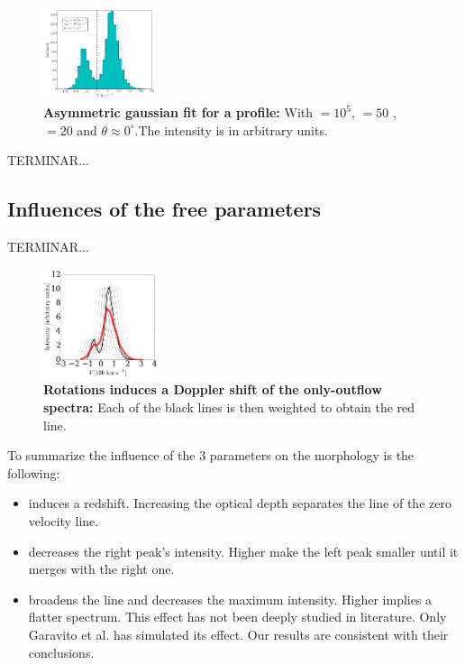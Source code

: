 \documentclass[twocolappendix]{latex/emulateapj}
\begin{document}
\begin{figure}[h!]
	\begin{center}
		\includegraphics[width=0.3\textwidth]{./figures/asymmetric_gaussian_fit}
	\end{center}
	\caption{\textbf{Asymmetric gaussian fit for a \lya profile:} With \tauh$=10^5$, \vrot$=50$ \kms, \vout$=20$ \kms and $\theta \approx 0^\circ$.The intensity is in arbitrary units.
		\label{fig:asymmetric_gaussian_fit}}
\end{figure}

TERMINAR...\\


\subsection{Influences of the free parameters}

TERMINAR...\\

\begin{figure}[h!]
	\begin{center}
		\includegraphics[width=0.3\textwidth]{./figures/rotation_doppler_outflow}
	\end{center}
	\caption{\textbf{Rotations induces a Doppler shift of the only-outflow spectra:} Each of the black lines is then weighted to obtain the red line.
		\label{fig:rotation_doppler_outflow}}
\end{figure}

To summarize the influence of the 3 parameters on the \lya morphology is the following: 

\begin{itemize}
	\item \tauh induces a redshift. Increasing the optical depth separates the line of the zero velocity line. \\
	\item \vout decreases the right peak's intensity. Higher \vout make the left peak smaller until it merges with the right one. \\
	\item \vrot broadens the line and decreases the maximum intensity. Higher \vrot implies a flatter spectrum. This effect has not been deeply studied in literature. Only Garavito et al. \cite{Garavito14} has simulated its effect. Our results are consistent with their conclusions. 
\end{itemize}
\end{document}
